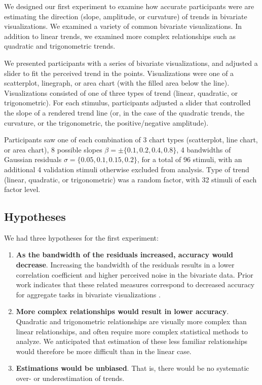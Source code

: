 \documentclass{sigchi}
\begin{document}
We designed our first experiment to examine how accurate participants were are estimating the direction (slope, amplitude, or curvature) of trends in bivariate visualizations. We examined a variety of common bivariate visualizations. In addition to linear trends, we examined more complex relationships such as quadratic and trigonometric trends.

We presented participants with a series of bivariate visualizations, and adjusted a slider to fit the perceived trend in the points. Visualizations were one of a scatterplot, linegraph, or area chart (with the filled area below the line). Visualizations consisted of one of three types of trend (linear, quadratic, or trigonometric). For each stimulus, participants adjusted a slider that controlled the slope of a rendered trend line (or, in the case of the quadratic trends, the curvature, or the trigonometric, the positive/negative amplitude).

Participants saw one of each combination of 3 chart types (scatterplot, line chart, or area chart), 8 possible slopes $\beta = \pm \{0.1,0.2,0.4,0.8\}$, 4 bandwidths of Gaussian residuals $\sigma = \{0.05,0.1,0.15,0.2\}$, for a total of 96 stimuli, with an additional 4 validation stimuli otherwise excluded from analysis. Type of trend (linear, quadratic, or trigonometric) was a random factor, with 32 stimuli of each factor level.

\subsection{Hypotheses}

We had three hypotheses for the first experiment:
\begin{enumerate}
	\item \textbf{As the bandwidth of the residuals increased, accuracy would decrease}. Increasing the bandwidth of the residuals results in a lower correlation coefficient and higher perceived noise in the bivariate data. Prior work indicates that these related measures correspond to decreased accuracy for aggregate tasks in bivariate visualizations \cite{albers2014task,harrison2014ranking}.
	\item \textbf{More complex relationships would result in lower accuracy}. Quadratic and trigonometric relationships are visually more complex than linear relationships, and often require more complex statistical methods to analyze. We anticipated that estimation of these less familiar relationships would therefore be more difficult than in the linear case.
	\item \textbf{Estimations would be unbiased}. That is, there would be no systematic over- or underestimation of trends.
\end{enumerate}
\end{document}
